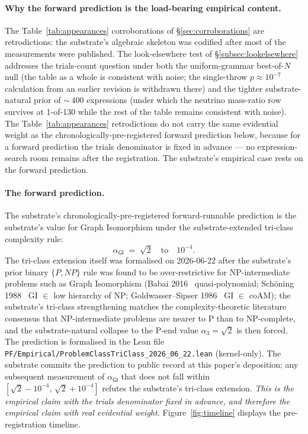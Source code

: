 \documentclass[11pt,a4paper]{amsart}
\theoremstyle{plain}
\theoremstyle{definition}
\begin{document}
\paragraph{Why the forward prediction is the load-bearing empirical content.} The Table~\ref{tab:appearances} corroborations of \S\ref{sec:corroborations} are retrodictions: the substrate's algebraic skeleton was codified after most of the measurements were published. The look-elsewhere test of \S\ref{subsec:lookelsewhere} addresses the trials-count question under both the uniform-grammar best-of-$N$ null (the table as a whole is consistent with noise; the single-throw $p \approx 10^{-7}$ calculation from an earlier revision is withdrawn there) and the tighter substrate-natural prior of $\sim$\,400 expressions (under which the neutrino mass-ratio row survives at 1-of-130 while the rest of the table remains consistent with noise). The Table~\ref{tab:appearances} retrodictions do not carry the same evidential weight as the chronologically-pre-registered forward prediction below, because for a forward prediction the trials denominator is fixed in advance --- no expression-search room remains after the registration. The substrate's empirical case rests on the forward prediction.

\paragraph{The forward prediction.} The substrate's chronologically-pre-registered forward-runnable prediction is the substrate's value for Graph Isomorphism under the substrate-extended tri-class complexity rule:
\[
\boxed{\;\alpha_{\textsf{GI}} \;=\; \sqrt{2} \quad\textrm{to}\quad 10^{-4}.\;}
\]
The tri-class extension itself was formalised on 2026-06-22 after the substrate's prior binary $\{P, NP\}$ rule was found to be over-restrictive for NP-intermediate problems such as Graph Isomorphism (Babai 2016~\cite{babai2016} quasi-polynomial; Sch\"oning 1988~\cite{schoning1988} GI $\in$ low hierarchy of NP; Goldwasser--Sipser 1986~\cite{goldwasser1986} GI $\in$ coAM); the substrate's tri-class strengthening matches the complexity-theoretic literature consensus that NP-intermediate problems are nearer to P than to NP-complete, and the substrate-natural collapse to the P-end value $\alpha_3 = \sqrt{2}$ is then forced. The prediction is formalised in the Lean file \texttt{PF/Empirical/ProblemClassTriClass\_2026\_06\_22.lean} (kernel-only). The substrate commits the prediction to public record at this paper's deposition; any subsequent measurement of $\alpha_{\textsf{GI}}$ that does not fall within $[\sqrt{2} - 10^{-4},\,\sqrt{2} + 10^{-4}]$ refutes the substrate's tri-class extension. \emph{This is the empirical claim with the trials denominator fixed in advance, and therefore the empirical claim with real evidential weight.} Figure~\ref{fig:timeline} displays the pre-registration timeline.
\end{document}
